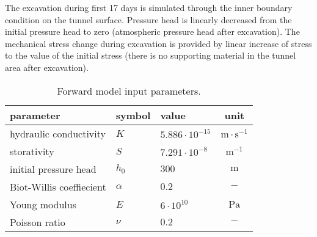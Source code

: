 \documentclass{article}
\def\unit#1{\mathrm{#1}}
\begin{document}
The excavation during first 17 days is simulated through the inner boundary condition on the tunnel surface.
Pressure head is linearly decreased from the initial pressure head to zero (atmospheric pressure head after excavation).
The mechanical stress change during excavation is provided by linear increase of stress to the value of the initial stress
(there is no supporting material in the tunnel area after excavation).

\begin{table}[!htb]
    \centering
    \begin{tabular}{|lllc|}
        \hline
        parameter & symbol & value & unit \\
        \hline
        hydraulic conductivity & $K$ & $5.886\cdot10^{-15}$ & $\unit{m\cdot s^{-1}}$ \\
        storativity & $S$ & $7.291\cdot10^{-8}$ & $\unit{m^{-1}}$ \\
        initial pressure head & $h_0$ & $300$ & $\unit{m}$ \\
        Biot-Willis coeffiecient & $\alpha$ & $0.2$ & $\unit{-}$ \\
        Young modulus & $E$ & $6\cdot10^{10}$ & $\unit{Pa}$ \\
        Poisson ratio & $\nu$ & $0.2$ & $\unit{-}$ \\
    \hline
    \end{tabular}
    \caption{Forward model input parameters.}
    \label{tab:model_01_parameters}
\end{table}

\end{document}
